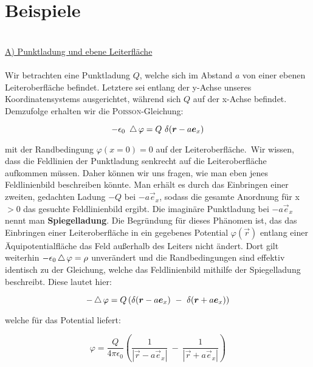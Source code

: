 \section{Beispiele}
\ \\
\underline{A)  Punktladung und ebene Leiterfläche}\
\\
\ \\
Wir betrachten eine Punktladung $Q$, welche sich im Abstand $a$ von einer ebenen Leiteroberfläche befindet. Letztere sei entlang der y-Achse unseres Koordinatensystems ausgerichtet, während sich $Q$ auf der x-Achse befindet.
Demzufolge erhalten wir die \textsc{Poisson}-Gleichung:

\begin{equation*}
-\epsilon_0 \ \laplace\varphi = Q \ \delta(\vec{r}-a\vec{e}_x)
\end{equation*}

mit der Randbedingung $\varphi(x=0) = 0$ auf der Leiteroberfläche.\
Wir wissen, dass die Feldlinien der Punktladung senkrecht auf die Leiteroberfläche aufkommen müssen. Daher können wir uns fragen, wie man eben jenes Feldlinienbild beschreiben könnte. Man erhält es durch das Einbringen einer zweiten, gedachten Ladung $-Q$ bei $-a\vec{e}_x$, sodass die gesamte Anordnung für x$>0$ das gesuchte Feldlinienbild ergibt. Die imaginäre Punktladung bei $-a\vec{e}_x$ nennt man \textbf{Spiegelladung}. Die Begründung für dieses Phänomen ist, das das Einbringen einer Leiteroberfläche in ein gegebenes Potential $\varphi (\vec{r})$ entlang einer Äquipotentialfläche das Feld außerhalb des Leiters nicht ändert. Dort gilt weiterhin $-\epsilon_0 \mathop{{}\bigtriangleup}\nolimits\varphi = \rho$ unverändert und die Randbedingungen sind effektiv identisch zu der Gleichung, welche das Feldlinienbild mithilfe der Spiegelladung beschreibt. Diese lautet hier:

\begin{equation*}
- \laplace\varphi = Q \left(\delta(\vec{r}-a\vec{e}_x) \ - \ \delta(\vec{r}+a\vec{e}_x)\right)
\end{equation*}

welche für das Potential liefert:

\begin{equation*}
\varphi = \frac{Q}{4\pi\epsilon_0} \left(\frac{1}{|\vec{r}-a\vec{e}_x|} \ - \ \frac{1}{|\vec{r}+a\vec{e}_x|}\right)
\end{equation*}
\ \\
\ \\

